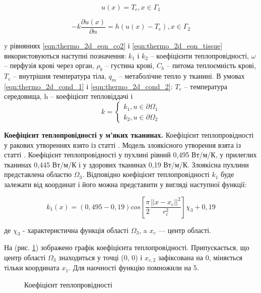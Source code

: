 \begin{equation}
    \label{eqn:thermo_2d_cond_1}
    u(x) = T_c, x \in \Gamma_1
\end{equation}

\begin{equation}
    \label{eqn:thermo_2d_cond_2}
    -k\dfrac{\partial{u(x)}}{\partial{n}} = h(u(x) - T_e), x \in \Gamma_2
\end{equation}

\noindent y рівняннях \ref{eqn:thermo_2d_eqn_co2} і \ref{eqn:thermo_2d_eqn_tissue} використовуються наступні позначення:
$k_1$ і $k_2$ -- коефіцієнти теплопровідності, $\omega$ -- перфузія крові через орган, $\rho_b$ -- густина крові, $C_b$ 
-- питома теплоємність крові, $T_c$ -- внутрішня температура тіла, $q_m$ -- метаболічне тепло у тканині. В умовах 
\ref{eqn:thermo_2d_cond_1} і \ref{eqn:thermo_2d_cond_2}: $T_e$ -- температура середовища, h -- коефіцієнт тепловіддачі і
$$k=\begin{cases}
k_1, u \in \partial{\Omega_1} \\
k_2, u \in \partial{\Omega_2}
\end{cases}
$$

\textbf{Коефіцієнт теплопровідності у м'яких тканинах.} Коефіцієнт теплопровідності у ракових утвореннях взято із статті 
\cite{lung-tumor-thermal-conductivity}. Модель злоякісного утворення взята із статті \cite{tumor-thermal-model}.
Коефіцієнт теплопровідності у пухлині рівний 0,495 Вт/м/К, у прилеглих тканинах 0,445 Вт/м/К і у здорових тканинах 
0,19 Вт/м/К. Злоякісна пухлини представлена областю $\Omega_3$. Відповідно коефіцієнт теплопровідності $k_1$ буде 
залежати від координат і його можна представити у вигляді наступної функції:

\begin{equation}
    \label{eqn:thermo_2d_thermal_conductivity}
    k_1(x) = (0,495 - 0,19)cos\left[\frac{\pi}{2}\frac{||x-x_c||^2}{r_c^2}\right]\chi_3 + 0,19
\end{equation}

\noindent де $\chi_3$ - характеристична функція області $\Omega_3$, a $x_c$ --- центр області.

\noindent На (рис. \ref{fig:thermo_2d_thermal_conductivity}) зображено графік коефіцієнта теплопровідності. 
Припускається, що центр області $\Omega_3$ знаходиться у точці (0, 0) і $x_{c,2}$ зафіксована на 0, міняється тільки 
координата $x_1$. Для наочності функцію помножили на 5. 

\begin{figure}[ht!]
    \centering
    \caption{Коефіцієнт теплопровідності}
    \label{fig:thermo_2d_thermal_conductivity}
\end{figure}

